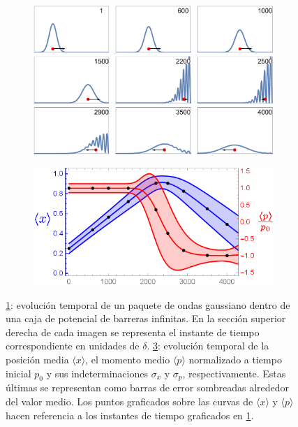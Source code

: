 \documentclass[aps,prb,twocolumn,superscriptaddress,floatfix,longbibliography]{revtex4-2}
\begin{document}
\begin{figure}
     \centering
     \begin{subfigure}[b]{0.45\textwidth}
         \centering
         \includegraphics[width=\textwidth]{evolution_1.pdf}
         \caption{\label{fig:evolution_1}}
     \end{subfigure}
     \hfill
     \begin{subfigure}[b]{0.45\textwidth}
         \centering
         \includegraphics[width=\textwidth]{valores_medios_1.png}
         \caption{\label{fig:valores_medios_1}}
     \end{subfigure}
    \caption{\ref{fig:evolution_1}: evolución temporal de un paquete de ondas gaussiano dentro de una caja de potencial de barreras infinitas. En la sección superior derecha de cada imagen se representa el instante de tiempo correspondiente en unidades de $\delta$. \ref{fig:valores_medios_1}: evolución temporal de la posición media $\langle x \rangle$, el momento medio $\langle p \rangle$ normalizado a tiempo inicial $p_0$ y sus indeterminaciones $\sigma_x$ y $\sigma_p$, respectivamente. Estas últimas se representan como barras de error sombreadas alrededor del valor medio. Los puntos graficados sobre las curvas de $\langle x \rangle$ y $\langle p \rangle$ hacen referencia a los instantes de tiempo graficados en \ref{fig:evolution_1}.}
\end{figure}
\end{document}
